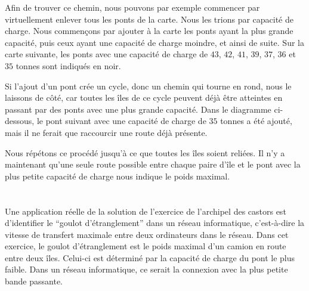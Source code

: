 {{{\centering%
\par}

Afin de trouver ce chemin, nous pouvons par exemple commencer par virtuellement enlever tous les ponts de la carte. Nous les trions par capacité de charge. Nous commençons par ajouter à la carte les ponts ayant la plus grande capacité, puis ceux ayant une capacité de charge moindre, et ainsi de suite. Sur la carte suivante, les ponts avec une capacité de charge de $43$, $42$, $41$, $39$, $37$, $36$ et $35$ tonnes sont indiqués en noir.

{\centering%
\par}

Si l’ajout d’un pont crée un cycle, donc un chemin qui tourne en rond, nous le laissons de côté, car toutes les îles de ce cycle peuvent déjà être atteintes en passant par des ponts avec une plus grande capacité. Dans le diagramme ci-dessous, le pont suivant avec une capacité de charge de $35$ tonnes a été ajouté, mais il ne ferait que raccourcir une route déjà présente.

{\centering%
\par}

Nous répétons ce procédé jusqu’à ce que toutes les îles soient reliées. Il n’y a maintenant qu’une seule route possible entre chaque paire d’île et le pont avec la plus petite capacité de charge nous indique le poids maximal.

{\centering%
\par}



\section*{\BrochureItsInformatics}
Une application réelle de la solution de l’exercice de l’archipel des castors est d’identifier le “goulot d’étranglement” dans un réseau informatique, c’est-à-dire la vitesse de transfert maximale entre deux ordinateurs dans le réseau. Dans cet exercice, le goulot d’étranglement est le poids maximal d’un camion en route entre deux îles. Celui-ci est déterminé par la capacité de charge du pont le plus faible. Dans un réseau informatique, ce serait la connexion avec la plus petite bande passante.

}}
